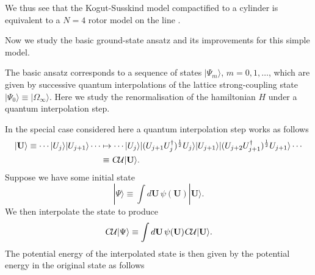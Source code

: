 \documentclass[12pt]{amsart}
\theoremstyle{definition}
\theoremstyle{remark}
\numberwithin{equation}{section}
\begin{document}
We thus see that the Kogut-Susskind model compactified to a cylinder is equivalent to a $N=4$ rotor model on the line \cite{sachdev:2011a}.

Now we study the basic ground-state ansatz and its improvements for this simple model.

The basic ansatz corresponds to a sequence of states $|\Psi_m\rangle$, $m = 0, 1, \ldots$, which are given by successive quantum interpolations of the lattice strong-coupling state $|\Psi_0\rangle \equiv |\Omega_\infty\rangle$. Here we study the renormalisation of the hamiltonian $H$ under a quantum interpolation step. 

In the special case considered here a quantum interpolation step works as follows
\begin{equation}
	\begin{split}
		|\mathbf{U}\rangle \equiv \cdots |U_j\rangle |U_{j+1}\rangle \cdots &\mapsto \cdots |U_j\rangle |(U_{j+1} U_j^\dag)^{\frac12} U_j\rangle |U_{j+1}\rangle  |(U_{j+2} U_{j+1}^\dag)^{\frac12} U_{j+1}\rangle  \cdots \\
		&\equiv \textsl{C}\mathcal{U}|\mathbf{U}\rangle.
	\end{split}
\end{equation}
Suppose we have some initial state
\begin{equation}
	|\Psi\rangle \equiv \int d\mathbf{U}\, \psi(\mathbf{U}) |\mathbf{U}\rangle.
\end{equation}
We then interpolate the state to produce
\begin{equation}
	\textsl{C}\mathcal{U}|\Psi\rangle \equiv \int d\mathbf{U}\, \psi(\mathbf{U}) \textsl{C}\mathcal{U}|\mathbf{U}\rangle.
\end{equation}
The potential energy of the interpolated state is then given by the potential energy in the original state as follows
\end{document}
